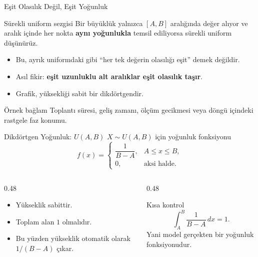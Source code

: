 \documentclass[light]{lutbeamer}
\begin{document}
\begin{frame}{Eşit Olasılık Değil, Eşit Yoğunluk}
    \small
    \begin{block}{Sürekli uniform sezgisi}
        Bir büyüklük yalnızca \([A,B]\) aralığında değer alıyor ve aralık içinde
        her nokta \textbf{aynı yoğunlukla} temsil ediliyorsa sürekli uniform düşünürüz.
    \end{block}

    \begin{itemize}
        \item Bu, ayrık uniformdaki gibi ``her tek değerin olasılığı eşit'' demek değildir.
        \item Asıl fikir: \textbf{eşit uzunluklu alt aralıklar eşit olasılık taşır}.
        \item Grafik, yüksekliği sabit bir dikdörtgendir.
    \end{itemize}

    \begin{alertblock}{Örnek bağlam}
        Toplantı süresi, geliş zamanı, ölçüm gecikmesi veya döngü içindeki rastgele faz konumu.
    \end{alertblock}
\end{frame}

\begin{frame}{Dikdörtgen Yoğunluk: \(U(A,B)\)}
    \small
    \(X \sim U(A,B)\) için yoğunluk fonksiyonu
    \[
    f(x)=
    \begin{cases}
    \dfrac{1}{B-A}, & A \le x \le B,\\
    0, & \text{aksi halde}.
    \end{cases}
    \]

    \begin{columns}[T]
        \begin{column}{0.48\textwidth}
            \begin{itemize}
                \item Yükseklik sabittir.
                \item Toplam alan \(1\) olmalıdır.
                \item Bu yüzden yükseklik otomatik olarak \(1/(B-A)\) çıkar.
            \end{itemize}
        \end{column}
        \begin{column}{0.48\textwidth}
            \begin{exampleblock}{Kısa kontrol}
                \[
                \int_A^B \frac{1}{B-A}\,dx=1.
                \]
                Yani model gerçekten bir yoğunluk fonksiyonudur.
            \end{exampleblock}
        \end{column}
    \end{columns}
\end{frame}
\end{document}
